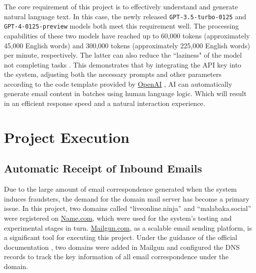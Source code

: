 \documentclass[ oneside,%
                    author={Cassie Qing Tang},
                    degree={BSc},
                     title={An Automated Response System for Disrupting Online Pet Scamming \\ },
                    subtitle={ }]{dissertation}
\begin{document}
The core requirement of this project is to effectively understand and generate natural language text. In this case, the newly released \texttt{GPT-3.5-turbo-0125} and \texttt{GPT-4-0125-preview} models both meet this requirement well. The processing capabilities of these two models have reached up to 60,000 tokens (approximately 45,000 English words) and 300,000 tokens (approximately 225,000 English words) per minute, respectively. The latter can also reduce the ``laziness" of the model not completing tasks \cite{noauthor_openai_nodate}. This demonstrates that by integrating the API key into the system, adjusting both the necessary prompts and other parameters according to the code template provided by \href{https://openai.com/}{OpenAI} \cite{noauthor_openai_nodate}, AI can automatically generate email content in batches using human language logic. Which will result in an efficient response speed and a natural interaction experience.




\chapter{Project Execution}
\section{Automatic Receipt of Inbound Emails}
Due to the large amount of email correspondence generated when the system induces fraudsters, the demand for the domain mail server has become a primary issue. In this project, two domains called “liveonline.ninja” and “malabaka.social” were registered on \href{https://www.name.com}{Name.com}, which were used for the system's testing and experimental stages in turn. \href{https://www.mailgun.com}{Mailgun.com}, as a scalable email sending platform, is a significant tool for executing this project. Under the guidance of the official documentation \cite{noauthor_domain_nodate}, two domains were added in Mailgun and configured the DNS records to track the key information of all email correspondence under the domain.
\\
\end{document}
